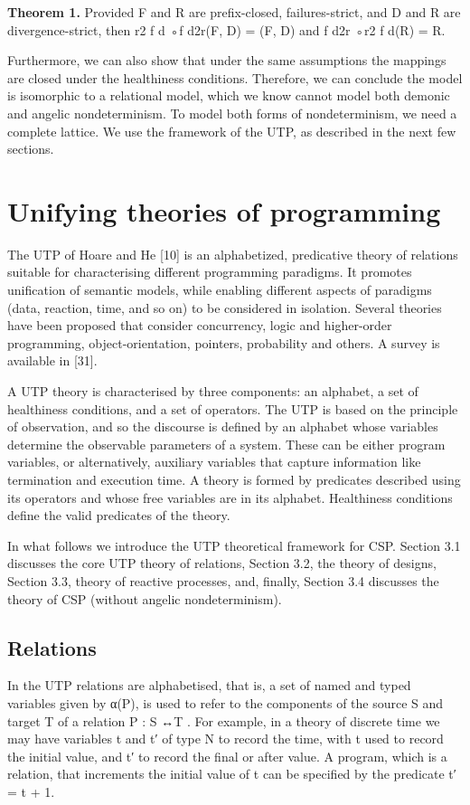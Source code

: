\documentclass[11pt]{article}
\begin{document}
\noindent\textbf{Theorem 1.} Provided F and R are prefix-closed, failures-strict, and D and R are divergence-strict, then r2 f d ◦f d2r(F, D) = (F, D) and f d2r ◦r2 f d(R) = R.


Furthermore, we can also show that under the same assumptions the mappings are closed under the healthiness conditions. Therefore, we can conclude the model is isomorphic to a relational model, which we know cannot model both demonic and angelic nondeterminism. To model both forms of nondeterminism, we need a complete lattice. We use the framework of the UTP, as described in the next few sections.

\section{Unifying theories of programming}
The UTP of Hoare and He [10] is an alphabetized, predicative theory of relations suitable for characterising different programming paradigms. It promotes unification of semantic models, while enabling different aspects of paradigms (data, reaction, time, and so on) to be considered in isolation. Several theories have been proposed that consider concurrency, logic and higher-order programming, object-orientation, pointers, probability and others. A survey is available in [31].

A UTP theory is characterised by three components: an alphabet, a set of healthiness conditions, and a set of operators. The UTP is based on the principle of observation, and so the discourse is defined by an alphabet whose variables determine the observable parameters of a system. These can be either program variables, or alternatively, auxiliary variables that capture information like termination and execution time. A theory is formed by predicates described using its operators and whose free variables are in its alphabet. Healthiness conditions define the valid predicates of the theory.

In what follows we introduce the UTP theoretical framework for CSP. Section 3.1 discusses the core UTP theory of relations, Section 3.2, the theory of designs, Section 3.3, theory of reactive processes, and, finally, Section 3.4 discusses the theory of CSP (without angelic nondeterminism).

\subsection{Relations}
In the UTP relations are alphabetised, that is, a set of named and typed variables given by α(P), is used to refer to the components of the source S and target T of a relation P : S ↔T . For example, in a theory of discrete time we may have variables t and t′ of type N to record the time, with t used to record the initial value, and t′ to record the final or after value. A program, which is a relation, that increments the initial value of t can be specified by the predicate t′ = t + 1.
\end{document}
